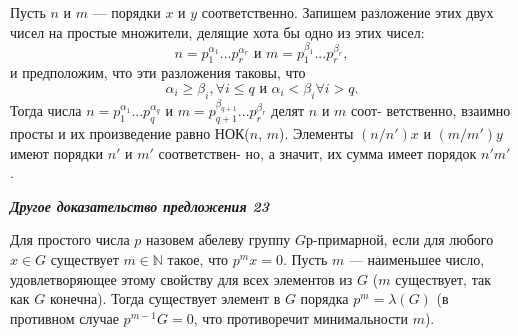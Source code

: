 \documentclass{../template/mai_book}
\begin{document}
\begin{myproof}
Пусть $n$ и $m$ — порядки $x$ и $y$ соответственно. Запишем разложение\linebreak
этих двух чисел на простые множители, делящие хота бы одно из\linebreak
этих чисел:
$$n=p_1^{\alpha_1}...p_r^{\alpha_r} \text{ и } m = p_1^{\beta_1}...p_r^{\beta_r},$$
и предположим, что эти разложения таковы, что
$$\alpha_i \ge \beta_i, \forall i \le q \text{ и } \alpha_i < \beta_i  \forall i > q.$$
Тогда числа $n=p_1^{\alpha_1}...p_q^{\alpha_q} \text{ и } m = p_{q+1}^{\beta_{q+1}}...p_r^{\beta_r}$ делят $n$ и $m$ соот­-\linebreak
ветственно, взаимно просты и их произведение равно НОК($n$, $m$).\linebreak
Элементы $(n/n')x$ и $(m/m')y$ имеют порядки $n'$ и $m'$ соответствен-\linebreak
но, а значит, их сумма имеет порядок $n'm'$.
\end{myproof}
\textbf{\textit{Другое доказательство предложения 23}}

Для простого числа $p$ назовем абелеву группу $G р$-примарной, если\linebreak
для любого $x \in G$ существует $m \in \mathbb{N}$ такое, что $p^mx= 0$. Пусть $m$ —\linebreak
наименьшее число, удовлетворяющее этому свойству для всех элементов\linebreak
из $G$ ($m$ существует, так как $G$ конечна). Тогда существует элемент в $G$\linebreak
порядка $p^m = \lambda(G)$ (в противном случае $p^{m - 1} G = 0$, что противоречит\linebreak
минимальности $m$).
\end{document}
